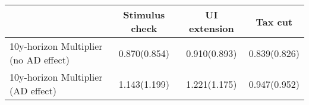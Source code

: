 \begin{tabular}{@{}lccc@{}} 
\toprule 
& Stimulus check    & UI extension    & Tax cut     \\  \midrule 
10y-horizon Multiplier (no AD effect)  &0.870(0.854)  & 0.910(0.893)  & 0.839(0.826)     \\ 
10y-horizon Multiplier (AD effect) &1.143(1.199)  & 1.221(1.175)  & 0.947(0.952)     \\ 
\end{tabular}  
